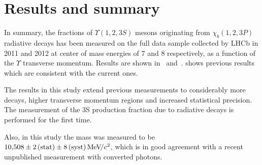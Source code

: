 \section{Results and summary}
\label{sec:results}

In summary, the fractions of $\Upsilon(1,2,3S)$ mesons originating from $\chi_b(1,2,3P)$ 
radiative decays has been measured on the full data sample collected by LHCb in 2011 and 2012 
at center of mass energies of 7 and 8 \tev respectively, as a function of the $\Upsilon$ 
transverse momentum. Results are shown in~
and~.
 shows previous \lhcb results which
are consistent with the current ones.






The results in this study extend previous \lhcb measurements to considerably
more decays, higher transverse momentum regions and increased statistical
precision. The measurement of the 
\Y3S production fraction due to radiative \chibThreeP decays is performed for the first time.

Also, in this study the \chiboneThreeP mass was measured to be $10{,}508 \pm 2\mathrm{\,(stat)} \pm 8\mathrm{\,(syst)} {\mathrm{\,Me\kern -0.1em V\!/}c^2}$, 
which is in good agreement with a recent unpublished \lhcb measurement with converted photons.


